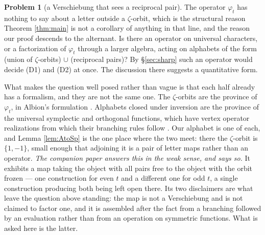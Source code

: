 \documentclass[11pt,reqno]{amsart}
\theoremstyle{plain}
\theoremstyle{definition}
\newtheorem{problem}[theorem]{Problem}
\begin{document}
\begin{problem}[a Verschiebung that sees a reciprocal pair]\label{prob:versch}
The operator $\varphi_t$ has nothing to say about a letter outside a $\zeta$-orbit, which is the
structural reason Theorem \ref{thm:main} is not a corollary of anything in that line, and the reason
our proof descends to the alternant. Is there an operator on universal characters, or a
factorization of $\varphi_t$ through a larger algebra, acting on alphabets of the form (union of
$\zeta$-orbits) $\cup$ (reciprocal pairs)? By \S\ref{sec:sharp} such an operator would decide (D1)
and (D2) at once. The discussion there suggests a quantitative form.

What makes the question well posed rather than vague is that each half already has a formalism, and
they are not the same one. The $\zeta$-orbits are the province of $\varphi_t$, in Albion's
formulation \cite{Alb23}. Alphabets closed under inversion are the province of the universal
symplectic and orthogonal functions, which have vertex operator realizations from which their
branching rules follow \cite{JJLW24}. Our alphabet is one of each, and Lemma \ref{lem:AtoSp} is the
one place where the two meet: there the $\zeta$-orbit is $\{1,-1\}$, small enough that adjoining it
is a pair of letter maps rather than an operator.
\emph{The companion paper \cite{PaperII} answers this in the weak sense, and says so.} It exhibits a
map taking the object with all pairs free to the object with the orbit frozen --- one construction
for even $t$ and a different one for odd $t$, a single construction producing both being left open
there. Its two disclaimers are what leave the question above standing: the map is not a Verschiebung
and is not claimed to factor one, and it is assembled after the fact from a branching followed by an
evaluation rather than from an operation on symmetric functions. What is asked here is the latter.
\end{problem}
\end{document}
